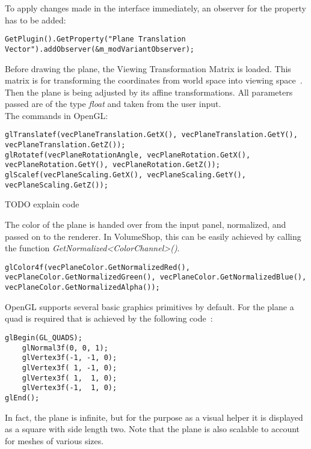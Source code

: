 
To apply changes made in the interface immediately, an observer for the property has to be added:
\begin{lstlisting}
GetPlugin().GetProperty("Plane Translation Vector").addObserver(&m_modVariantObserver);
\end{lstlisting}

Before drawing the plane, the Viewing Transformation Matrix is loaded. This matrix is for transforming the coordinates from world space into viewing space~\cite{book:computerGraphicsHearn}.\\
Then the plane is being adjusted by its affine transformations. All parameters passed are of the type \emph{float} and taken from the user input.\\
The commands in OpenGL:
\begin{lstlisting}
glTranslatef(vecPlaneTranslation.GetX(), vecPlaneTranslation.GetY(), vecPlaneTranslation.GetZ());
glRotatef(vecPlaneRotationAngle, vecPlaneRotation.GetX(), vecPlaneRotation.GetY(), vecPlaneRotation.GetZ());
glScalef(vecPlaneScaling.GetX(), vecPlaneScaling.GetY(), vecPlaneScaling.GetZ());
\end{lstlisting}

TODO explain code

The color of the plane is handed over from the input panel, normalized, and passed on to the renderer. In VolumeShop, this can be easily achieved by calling the function \emph{GetNormalized<ColorChannel>()}.
\begin{lstlisting}
glColor4f(vecPlaneColor.GetNormalizedRed(), vecPlaneColor.GetNormalizedGreen(), vecPlaneColor.GetNormalizedBlue(), vecPlaneColor.GetNormalizedAlpha());
\end{lstlisting}

OpenGL supports several basic graphics primitives by default. For the plane a quad is required that is achieved by the following code~\cite{book:computerGraphicsHill}: %
\begin{lstlisting}
glBegin(GL_QUADS);
	glNormal3f(0, 0, 1);
	glVertex3f(-1, -1, 0);
	glVertex3f( 1, -1, 0);
	glVertex3f( 1,  1, 0);
	glVertex3f(-1,  1, 0);
glEnd();
\end{lstlisting}

In fact, the plane is infinite, but for the purpose as a visual helper it is displayed as a square with side length two. Note that the plane is also scalable to account for meshes of various sizes.\\

